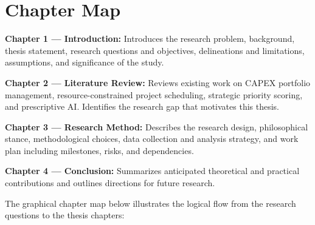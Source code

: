 \section{Chapter Map}
\label{sec:chapter_map}

\textbf{Chapter 1 — Introduction:}
Introduces the research problem, background, thesis statement, research questions and objectives,
delineations and limitations, assumptions, and significance of the study.

\textbf{Chapter 2 — Literature Review:}
Reviews existing work on CAPEX portfolio management, resource-constrained project scheduling,
strategic priority scoring, and prescriptive AI. Identifies the research gap that motivates
this thesis.

\textbf{Chapter 3 — Research Method:}
Describes the research design, philosophical stance, methodological choices, data collection
and analysis strategy, and work plan including milestones, risks, and dependencies.

\textbf{Chapter 4 — Conclusion:}
Summarizes anticipated theoretical and practical contributions and outlines directions for
future research.

\vspace{1em}
\noindent The graphical chapter map below illustrates the logical flow from the research questions
to the thesis chapters:

\vspace{1em}
\begin{center}
\end{center}
